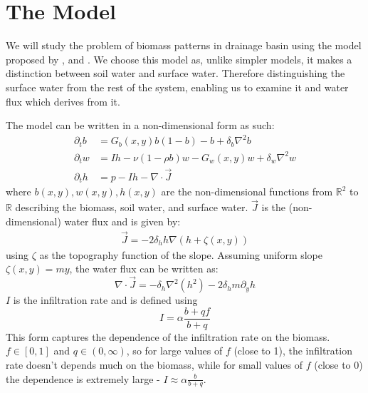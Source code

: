 \documentclass{article}
\numberwithin{equation}{section}
\begin{document}
\section{The Model}
We will study the problem of biomass patterns in drainage basin using the model proposed by \cite{gilad_phys_2004}, and \cite{gilad_mathematical_2007}. We choose this model as, unlike simpler models, it makes a distinction between soil water and surface water. Therefore distinguishing the surface water from the rest of the system, enabling us to examine it and water flux which derives from it.

The model can be written in a non-dimensional form as such:
\begin{align}
    \partial_t b & = G_b(x,y) b(1-b) - b + \delta_b\nabla^2 b              \\
    \partial_t w & = Ih - \nu(1-\rho b)w - G_w(x,y)w + \delta_w \nabla^2 w \\
    \partial_t h & = p - Ih - \nabla \cdot \vec{J}
\end{align}
where $b(x,y),w(x,y),h(x,y)$ are the non-dimensional functions from $\mathbb{R}^2$ to $\mathbb{R}$ describing the biomass, soil water, and surface water. $\vec{J}$ is the (non-dimensional) water flux and is given by:
\begin{align}
    \vec{J} =  -2\delta_h h\nabla\left(h+\zeta(x,y)\right)
\end{align}
using $\zeta$ as the topography function of the slope. Assuming uniform slope $\zeta(x,y)=my$, the water flux can be written as:
\begin{equation}
    \nabla \cdot \vec{J} = -\delta_h \nabla^2(h^2) - 2\delta_h m \partial_y h
\end{equation}
$I$ is the infiltration rate and is defined using
\begin{equation}
    I = \alpha \frac{b+qf}{b+q}
\end{equation}
This form captures the dependence of the infiltration rate on the biomass. $f\in[0,1]$ and $q\in(0,\infty)$, so for large values of $f$ (close to 1), the infiltration rate doesn't depends much on the biomass, while for small values of $f$ (close to 0) the dependence is extremely large - $I\approx \alpha\frac{b}{b+q}$.
\end{document}

